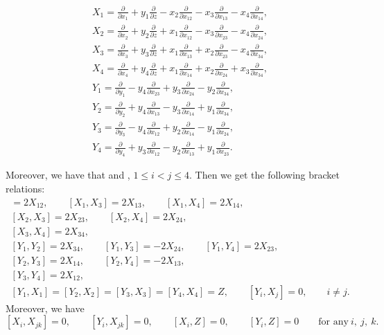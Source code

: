 \documentclass[pdftex]{sigma}
\numberwithin{equation}{section}
\theoremstyle{definition}
\newcommand{\0}{\boldsymbol{0}}
\newcommand{\pa}{\partial}
\begin{document}
\begin{gather*}
X_1 = \frac{\pa}{\pa x_1} + y_1\frac{\pa}{\pa z} - x_2\frac{\pa}{\pa x_{12}} - x_3\frac{\pa}{\pa x_{13}} -
x_4\frac{\pa}{\pa x_{14}},
\\
X_2 = \frac{\pa}{\pa x_2} + y_2\frac{\pa}{\pa z} + x_1\frac{\pa}{\pa x_{12}} - x_3\frac{\pa}{\pa x_{23}} -
x_4\frac{\pa}{\pa x_{24}},
\\
X_3 = \frac{\pa}{\pa x_3} + y_3\frac{\pa}{\pa z} + x_1\frac{\pa}{\pa x_{13}} + x_2\frac{\pa}{\pa x_{23}} -
x_4\frac{\pa}{\pa x_{34}},
\\
X_4 = \frac{\pa}{\pa x_4} + y_4\frac{\pa}{\pa z} + x_1\frac{\pa}{\pa x_{14}} + x_2\frac{\pa}{\pa x_{24}} +
x_3\frac{\pa}{\pa x_{34}},
\\
Y_1 = \frac{\pa}{\pa y_1} - y_4\frac{\pa}{\pa x_{23}} + y_3\frac{\pa}{\pa x_{24}} - y_2\frac{\pa}{\pa x_{34}},
\\
Y_2 = \frac{\pa}{\pa y_2} + y_4\frac{\pa}{\pa x_{13}} - y_3\frac{\pa}{\pa x_{14}} + y_1\frac{\pa}{\pa x_{34}},
\\
Y_3 = \frac{\pa}{\pa y_3} - y_4\frac{\pa}{\pa x_{12}} + y_2\frac{\pa}{\pa x_{14}} - y_1\frac{\pa}{\pa x_{24}},
\\
Y_4 = \frac{\pa}{\pa y_4} + y_3\frac{\pa}{\pa x_{12}} - y_2\frac{\pa}{\pa x_{13}} + y_1\frac{\pa}{\pa x_{23}}.
\end{gather*}

Moreover, we have that
\smash{$Z = \frac{\pa}{\pa z}$} and \smash{$X_{ij} = \frac{\pa}{\pa x_{ij}}$}, $1 \leq i < j \leq 4$.
Then we get the following bracket relations:
\begin{gather*}
[X_1, X_2] = 2X_{12},\qquad [X_1, X_3] = 2X_{13},\qquad [X_1, X_4] = 2X_{14},
\\
 [X_2, X_3] = 2X_{23},\qquad [X_2, X_4] = 2X_{24},
\\
 [X_3, X_4] = 2X_{34},
\\
[Y_1, Y_2] = 2X_{34},\qquad [Y_1, Y_3] = -2X_{24},\qquad [Y_1, Y_4] = 2X_{23},
\\
 [Y_2, Y_3] = 2X_{14},\qquad [Y_2, Y_4] = -2X_{13},
\\
 [Y_3, Y_4] = 2X_{12},
\\
[Y_1, X_1] = [Y_2, X_2] = [Y_3, X_3] = [Y_4, X_4] = Z, \qquad [Y_i, X_j] = 0, \qquad i \not= j.
\end{gather*}
Moreover, we have
\[
[X_i, X_{jk}] = 0, \qquad [Y_i, X_{jk}] = 0, \qquad [X_i, Z] = 0, \qquad [Y_i, Z] = 0 \qquad \text{for any} \ i, \ j, \ k.
\]
\end{document}
